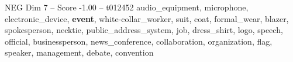 \begin{textsample}{NEG Dim 7 – Score -1.00 – t012452}  \label{ex:f7_neg_028}
audio\_equipment, microphone, electronic\_device, \textbf{event}, white-collar\_worker, suit, coat, formal\_wear, blazer, spokesperson, necktie, public\_address\_system, job, dress\_shirt, logo, speech, official, businessperson, news\_conference, collaboration, organization, flag, speaker, management, debate, convention

\end{textsample}
